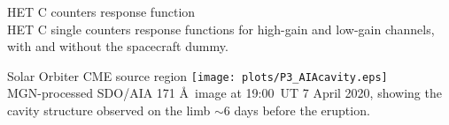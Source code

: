\documentclass[10pt,aspectratio=169,usenames,dvipsnames]{beamer}
\begin{document}
\begin{frame}{HET C counters response function}
\centering
\scalebox{0.75}{}\\
HET C single counters response functions for high-gain and low-gain channels, with and without the spacecraft dummy.
\end{frame}

\begin{frame}{Solar Orbiter CME source region}
    \centering
    \texttt{[image: plots/P3\_AIAcavity.eps]}\\   
    MGN-processed SDO/AIA 171 \AA\ image at 19:00~UT 7 April 2020, showing the cavity structure observed on the limb  $\sim$6 days before the eruption.
\end{frame}
\end{document}
